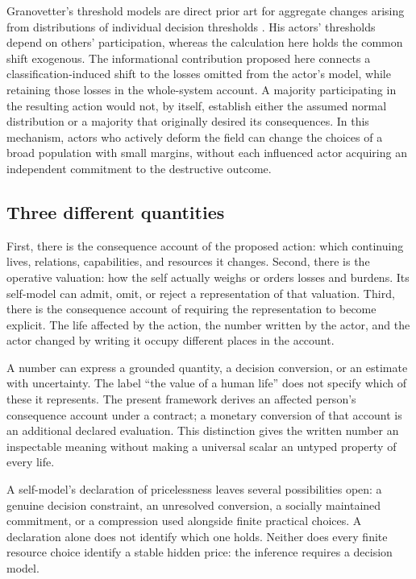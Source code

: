 \documentclass[11pt,a4paper]{article}
\theoremstyle{remark}
\begin{document}
Granovetter's threshold models are direct prior art for aggregate changes arising
from distributions of individual decision thresholds
\citep{granovetter1978threshold}. His actors' thresholds depend on others'
participation, whereas the calculation here holds the common shift exogenous.
The informational contribution proposed here connects a classification-induced
shift to the losses omitted from the actor's model, while retaining those losses
in the whole-system account. A majority participating in the resulting action
would not, by itself, establish either the assumed normal distribution or a
majority that originally desired its consequences. In this mechanism, actors
who actively deform the field can change the choices of a broad population
with small margins, without each influenced actor acquiring an independent
commitment to the destructive outcome.

\subsection{Three different quantities}

First, there is the consequence account of the proposed action: which continuing
lives, relations, capabilities, and resources it changes. Second, there is the operative
valuation: how the self actually weighs or orders losses and burdens. Its
self-model can admit, omit, or reject a representation of that valuation. Third,
there is the consequence account of requiring the representation to become
explicit. The life affected by the action, the number written by the actor,
and the actor changed by writing it occupy different places in the account.

A number can express a grounded quantity, a decision conversion, or an estimate
with uncertainty. The label ``the value of a human life'' does not specify which
of these it represents. The present framework derives an affected person's
consequence account under a contract; a monetary conversion of that account is
an additional declared evaluation. This distinction gives the written number
an inspectable meaning without making a universal scalar an untyped property
of every life.

A self-model's declaration of pricelessness leaves several possibilities open:
a genuine decision constraint, an unresolved conversion, a socially maintained
commitment, or a compression used alongside finite practical choices. A declaration
alone does not identify which one holds. Neither does every finite resource
choice identify a stable hidden price: the inference requires a decision model.
\end{document}
